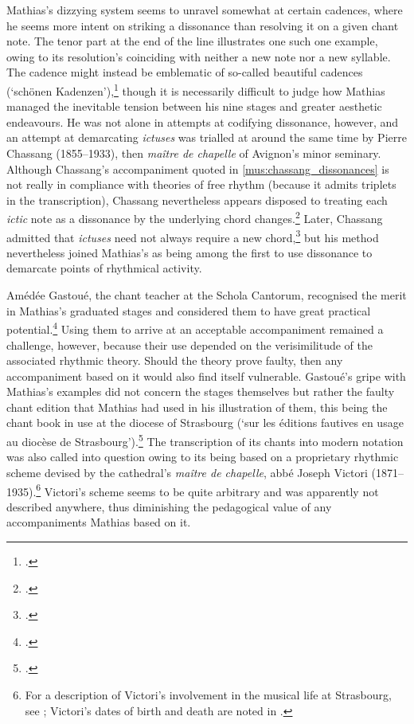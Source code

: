 Mathias's dizzying system seems to unravel somewhat at certain cadences, where he seems more intent on striking a dissonance than resolving it on a given chant note.
The tenor part at the end of the line illustrates one such one example, owing to its resolution's coinciding with neither a new note nor a new syllable.
The cadence might instead be emblematic of so-called beautiful cadences (`schönen Kadenzen'),\footcite[124--5]{MathiasChoralbegleitung1903a} though it is necessarily difficult to judge how Mathias managed the inevitable tension between his nine stages and greater aesthetic endeavours.
%
He was not alone in attempts at codifying dissonance, however, and an attempt at demarcating \emph{ictuses} was trialled at around the same time by Pierre Chassang (1855--1933), then \emph{maître de chapelle} of Avignon's minor seminary.
Although Chassang's accompaniment quoted in \cref{mus:chassang_dissonances} is not really in compliance with theories of free rhythm (because it admits triplets in the transcription), Chassang nevertheless appears disposed to treating each \emph{ictic} note as a dissonance by the underlying chord changes.\footcite[110]{ChassangManuelaccompagnateurchant1904}
Later, Chassang admitted that \emph{ictuses} need not always require a new chord,\footcite[21]{Chassangaccompagnementchantgregorien1917} but his method nevertheless joined Mathias's as being among the first to use dissonance to demarcate points of rhythmical activity.

\label{sc:gastoue}%
Amédée Gastoué, the chant teacher at the Schola Cantorum,  recognised the merit in Mathias's graduated stages and considered them to have great practical potential.\footcite[p.~80 with attribution to Gastoué on p.~81]{GastoueRevueChoralbegleitung1905}
Using them to arrive at an acceptable accompaniment remained a challenge, however, because their use depended on the verisimilitude of the associated rhythmic theory.
Should the theory prove faulty, then any accompaniment based on it would also find itself vulnerable.
Gastoué's gripe with Mathias's examples did not concern the stages themselves but rather the faulty chant edition that Mathias had used in his illustration of them, this being the chant book in use at the diocese of Strasbourg (`sur les éditions fautives en usage au diocèse de Strasbourg').\footcite[385--6]{GastoueBibliographie1904}
The transcription of its chants into modern notation was also called into question owing to its being based on a proprietary rhythmic scheme devised by the cathedral's \emph{maître de chapelle}, abbé Joseph Victori (1871--1935).\footnote{For a description of Victori's involvement in the musical life at Strasbourg, see \cite[264--5]{GeyerviemusicaleStrasbourg1999}; Victori's dates of birth and death are noted in \cite[55]{Periodiques1936}.}
Victori's scheme seems to be quite arbitrary and was apparently not described anywhere, thus diminishing the pedagogical value of any accompaniments Mathias based on it.

